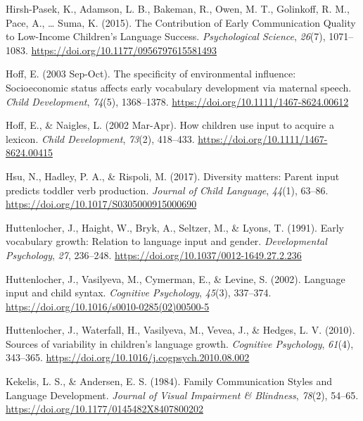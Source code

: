 \documentclass[
  man,floatsintext]{apa6}
\newlength{\cslhangindent}
\newlength{\cslentryspacingunit} %
\newenvironment{CSLReferences}[2] %
 {%
  \setlength{\parindent}{0pt}
  \ifodd #1
  \let\oldpar\par
  \def\par{\hangindent=\cslhangindent\oldpar}
  \fi
  \setlength{\parskip}{#2\cslentryspacingunit}
 }%
 {}
\begin{document}
\begin{CSLReferences}{1}{0}
\leavevmode{}%
Hirsh-Pasek, K., Adamson, L. B., Bakeman, R., Owen, M. T., Golinkoff, R. M., Pace, A., \ldots{} Suma, K. (2015). The {Contribution} of {Early Communication Quality} to {Low-Income Children}'s {Language Success}. \emph{Psychological Science}, \emph{26}(7), 1071--1083. \url{https://doi.org/10.1177/0956797615581493}

\leavevmode{}%
Hoff, E. (2003 Sep-Oct). The specificity of environmental influence: Socioeconomic status affects early vocabulary development via maternal speech. \emph{Child Development}, \emph{74}(5), 1368--1378. \url{https://doi.org/10.1111/1467-8624.00612}

\leavevmode{}%
Hoff, E., \& Naigles, L. (2002 Mar-Apr). How children use input to acquire a lexicon. \emph{Child Development}, \emph{73}(2), 418--433. \url{https://doi.org/10.1111/1467-8624.00415}

\leavevmode{}%
Hsu, N., Hadley, P. A., \& Rispoli, M. (2017). Diversity matters: Parent input predicts toddler verb production. \emph{Journal of Child Language}, \emph{44}(1), 63--86. \url{https://doi.org/10.1017/S0305000915000690}

\leavevmode{}%
Huttenlocher, J., Haight, W., Bryk, A., Seltzer, M., \& Lyons, T. (1991). Early vocabulary growth: {Relation} to language input and gender. \emph{Developmental Psychology}, \emph{27}, 236--248. \url{https://doi.org/10.1037/0012-1649.27.2.236}

\leavevmode{}%
Huttenlocher, J., Vasilyeva, M., Cymerman, E., \& Levine, S. (2002). Language input and child syntax. \emph{Cognitive Psychology}, \emph{45}(3), 337--374. \url{https://doi.org/10.1016/s0010-0285(02)00500-5}

\leavevmode{}%
Huttenlocher, J., Waterfall, H., Vasilyeva, M., Vevea, J., \& Hedges, L. V. (2010). Sources of variability in children's language growth. \emph{Cognitive Psychology}, \emph{61}(4), 343--365. \url{https://doi.org/10.1016/j.cogpsych.2010.08.002}

\leavevmode{}%
Kekelis, L. S., \& Andersen, E. S. (1984). Family {Communication Styles} and {Language Development}. \emph{Journal of Visual Impairment \& Blindness}, \emph{78}(2), 54--65. \url{https://doi.org/10.1177/0145482X8407800202}


\end{CSLReferences}
\end{document}
